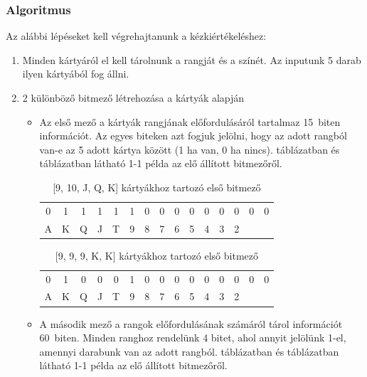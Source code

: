 \documentclass[]{thesis-ekf}
\theoremstyle{definition}
\theoremstyle{remark}
\begin{document}
\subsubsection{Algoritmus}

Az alábbi lépéseket kell végrehajtanunk a kézkiértékeléshez:

\begin{enumerate}
	\item Minden kártyáról el kell tárolnunk a rangját és a színét. Az inputunk 5 darab ilyen kártyából fog állni.
	\item 2 különböző bitmező létrehozása a kártyák alapján
	\begin{itemize}
		\item Az első mező a kártyák rangjának előfordulásáról tartalmaz 15~biten információt. Az egyes biteken azt fogjuk jelölni, hogy az adott rangból van-e az 5 adott kártya között (1 ha van, 0 ha nincs).  táblázatban és  táblázatban látható 1-1 példa az elő állított bitmezőről.
		
		\begin{table}[ht!]
			\centering
			\footnotesize
			\begin{tabular}{*{15}{c}}
				0 & 1 & 1 & 1 & 1 & 1 & 0 & 0 & 0 & 0 & 0 & 0 & 0 & 0 & 0\\
				A & K & Q & J & T & 9 & 8 & 7 & 6 & 5 & 4 & 3 & 2
			\end{tabular}
			\caption{[9, 10, J, Q, K] kártyákhoz tartozó első bitmező}
			\label{tab-bitfieldvalues1}
		\end{table}
		
		\begin{table}[ht!]
			\centering
			\footnotesize
			\begin{tabular}{*{15}{c}}
				0 & 1 & 0 & 0 & 0 & 1 & 0 & 0 & 0 & 0 & 0 & 0 & 0 & 0 & 0\\
				A & K & Q & J & T & 9 & 8 & 7 & 6 & 5 & 4 & 3 & 2
			\end{tabular}
			\caption{[9, 9, 9, K, K] kártyákhoz tartozó első bitmező}
			\label{tab-bitfieldvalues2}
		\end{table}
		
		\item A második mező a rangok előfordulásának számáról tárol információt 60~biten. Minden ranghoz rendelünk 4 bitet, ahol annyit jelölünk 1-el, amennyi darabunk van az adott rangból.  táblázatban és  táblázatban látható 1-1 példa az elő állított bitmezőről.
		

\end{itemize}
\end{enumerate}
\end{document}
